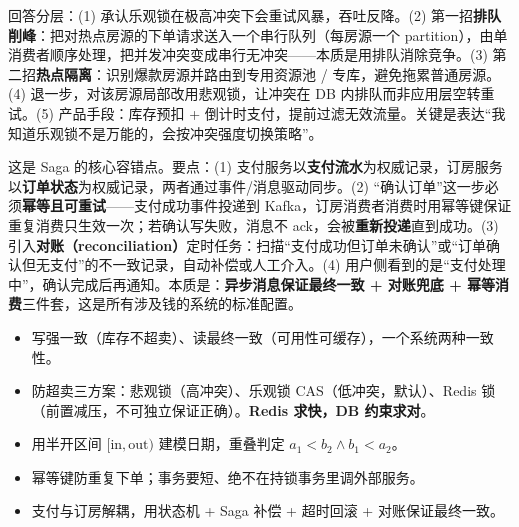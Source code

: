 \begin{followup}
回答分层：(1) 承认乐观锁在极高冲突下会重试风暴，吞吐反降。(2) 第一招\textbf{排队削峰}：把对热点房源的下单请求送入一个串行队列（每房源一个 partition），由单消费者顺序处理，把并发冲突变成串行无冲突——本质是用排队消除竞争。(3) 第二招\textbf{热点隔离}：识别爆款房源并路由到专用资源池 / 专库，避免拖累普通房源。(4) 退一步，对该房源局部改用悲观锁，让冲突在 DB 内排队而非应用层空转重试。(5) 产品手段：库存预扣 + 倒计时支付，提前过滤无效流量。关键是表达“我知道乐观锁不是万能的，会按冲突强度切换策略”。
\end{followup}

\begin{followup}
这是 Saga 的核心容错点。要点：(1) 支付服务以\textbf{支付流水}为权威记录，订房服务以\textbf{订单状态}为权威记录，两者通过事件/消息驱动同步。(2) “确认订单”这一步必须\textbf{幂等且可重试}——支付成功事件投递到 Kafka，订房消费者消费时用幂等键保证重复消费只生效一次；若确认写失败，消息不 ack，会被\textbf{重新投递}直到成功。(3) 引入\textbf{对账（reconciliation）}定时任务：扫描“支付成功但订单未确认”或“订单确认但无支付”的不一致记录，自动补偿或人工介入。(4) 用户侧看到的是“支付处理中”，确认完成后再通知。本质是：\textbf{异步消息保证最终一致 + 对账兜底 + 幂等消费}三件套，这是所有涉及钱的系统的标准配置。
\end{followup}

\begin{keypoint}[本章速记]
\begin{itemize}
  \item 写强一致（库存不超卖）、读最终一致（可用性可缓存），一个系统两种一致性。
  \item 防超卖三方案：悲观锁（高冲突）、乐观锁 CAS（低冲突，默认）、Redis 锁（前置减压，不可独立保证正确）。\textbf{Redis 求快，DB 约束求对}。
  \item 用半开区间 $[\text{in},\text{out})$ 建模日期，重叠判定 $a_1<b_2 \wedge b_1<a_2$。
  \item 幂等键防重复下单；事务要短、绝不在持锁事务里调外部服务。
  \item 支付与订房解耦，用状态机 + Saga 补偿 + 超时回滚 + 对账保证最终一致。
\end{itemize}
\end{keypoint}

